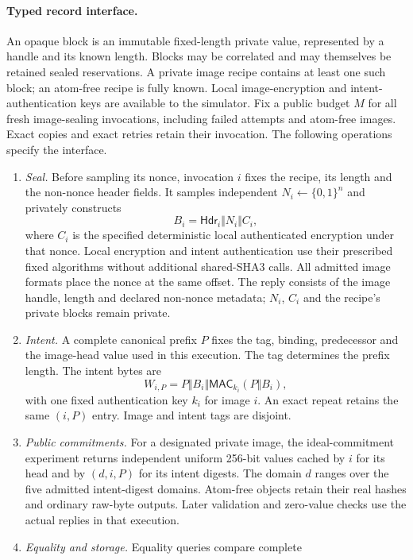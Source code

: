 \documentclass[pdflatex]{sn-jnl}
\theoremstyle{thmstyleone}
\theoremstyle{thmstylethree}
\theoremstyle{thmstyletwo}
\begin{document}
\paragraph{Typed record interface.}
An opaque block is an immutable fixed-length private value, represented by a
handle and its known length. Blocks may be correlated and may themselves be
retained sealed reservations. A private image recipe contains at least one
such block; an atom-free recipe is fully known. Local image-encryption and
intent-authentication keys are available to the simulator. Fix a public
budget $M$ for all fresh image-sealing invocations, including failed attempts
and atom-free images. Exact copies and exact retries retain their invocation.
The following operations specify the interface.

\begin{enumerate}
  \item \emph{Seal.} Before sampling its nonce, invocation $i$ fixes the
  recipe, its length and the non-nonce header fields. It samples independent
  $N_i\gets\{0,1\}^{n}$ and privately constructs
  \[
    B_i=\mathsf{Hdr}_i\Vert N_i\Vert C_i,
  \]
  where $C_i$ is the specified deterministic local authenticated encryption
  under that nonce. Local encryption and intent authentication use their
  prescribed fixed algorithms without additional shared-SHA3 calls. All
  admitted image formats place the nonce at the same offset. The reply
  consists of the image handle, length and declared non-nonce metadata;
  $N_i$, $C_i$ and the recipe's private blocks remain private.
  \item \emph{Intent.} A complete canonical prefix $P$ fixes the tag,
  binding, predecessor and the image-head value used in this execution.
  The tag determines the prefix length. The intent bytes are
  \[
    W_{i,P}=P\Vert B_i\Vert
       \mathsf{MAC}_{k_i}(P\Vert B_i),
  \]
  with one fixed authentication key $k_i$ for image $i$. An exact repeat
  retains the same $(i,P)$ entry. Image and intent tags are disjoint.
  \item \emph{Public commitments.} For a designated private image, the
  ideal-commitment experiment returns independent uniform 256-bit values
  cached by $i$ for its head and by $(d,i,P)$ for its intent digests. The
  domain $d$ ranges over the five admitted intent-digest domains. Atom-free
  objects retain their real hashes and ordinary raw-byte outputs. Later
  validation and zero-value checks use the actual replies in that execution.
  \item \emph{Equality and storage.} Equality queries compare complete

\end{enumerate}
\end{document}
